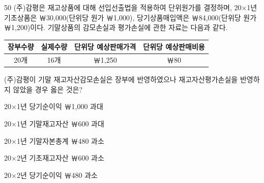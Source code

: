 \begin{question}{50}
(주)감평은 재고상품에 대해 선입선출법을 적용하여 단위원가를 결정하며, 20×1년 기초상품은 ￦30,000(단위당 원가 ￦1,000), 당기상품매입액은 ￦84,000(단위당 원가 ￦1,200)이다. 기말상품의 감모손실과 평가손실에 관한 자료는 다음과 같다.
\par{\small\centering\begin{tabular}{|c|c|c|c|}\hline
장부수량 & 실제수량 & 단위당 예상판매가격 & 단위당 예상판매비용 \\ \hline
20개 & 16개 & ￦1,250 & ￦80 \\ \hline
\end{tabular}\par}
(주)감평이 기말 재고자산감모손실은 장부에 반영하였으나 재고자산평가손실을 반영하지 않았을 경우 옳은 것은?
\begin{choices}
  \item 20×1년 당기순이익 ￦1,000 과대
  \item 20×1년 기말재고자산 ￦600 과대
  \item 20×1년 기말자본총계 ￦480 과소
  \item 20×2년 기초재고자산 ￦600 과소
  \item 20×2년 당기순이익 ￦480 과소
\end{choices}
\end{question}
